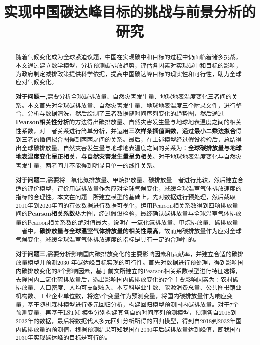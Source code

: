 \documentclass[withoutpreface,bwprint]{cumcmthesis}
\title{实现中国碳达峰目标的挑战与前景分析的研究}  %
\begin{document}
	\maketitle
\begin{abstract}
随着气候变化成为全球紧迫议题，中国在实现碳中和目标的过程中仍面临着诸多挑战，本文通过建立数学模型，分析预测碳排放趋势，评估各因素对实现碳中和目标的影响，为政府制定减排政策提供科学依据，提高中国碳达峰目标的现实性和可行性，助力全球应对气候变化。


\textbf{对于问题一,}需要分析全球碳排放量、自然灾害发生量、地球地表温度变化三者间的关系。本文首先对全球碳排放量、自然灾害发生量、地球地表温度三个附录文件，进行整合、分析与数据清洗，然后绘制了三者数据随时间序列变化的趋势图，然后通过\textbf{Pearson相关性分析}的方法得出碳排放量、自然灾害发生量与地球地表温度之间的相关性系数，对三者关系进行简单分析，并运用\textbf{三次样条插值函数}，通过\textbf{最小二乘法拟合}得到三者的插值拟合图得到两两之间的关系。最后，在上述模型经过假设检验后，总结得出全球碳排放量、自然灾害发生量与地球地表温度之间的关系为：\textbf{全球碳排放量与地球地表温度变化呈正相关}，\textbf{与自然灾害发生量呈负相关}。对于地球地表温度变化与自然灾害发生量，两者间并不能得到明显且单一的线性关系。

\textbf{对于问题二,}需要将一氧化氮排放量、甲烷排放量、碳排放量三者进行比较，然后建立合适的评价模型，评价用碳排放量作为应对全球气候变化，减缓全球温室气体排放速度的指标的合理性。本文在问题一所建立模型的基础上，先对数据进行预处理，然后截取2010年到2020年间的有效数据进行数据可视化，运用Pearson相关系数得到四项排放量间的\textbf{Pearson相关系数}热力图，经过假设检验，最终确认碳排放量与全球温室气体排放量的Pearson相关系数的绝对值最大，说明在一氧化氮排放量、甲烷排放量、碳排放量三者中，\textbf{碳排放量与全球温室气体排放量的相关性最高}，故而用碳排放量作为应对全球气候变化，减缓全球温室气体排放速度的指标是具有一定的合理性的。

\textbf{对于问题三,}需要分析影响国内碳排放变化的主要影响因素和贡献率，并建立合适的碳排放量模型并预测2030 年碳达峰目标实现的可行性。首先对数据进行预处理，得到影响国内碳排放变化的8个影响因素，基于前文所建立的Pearson相关系数模型进行特征选择，去除国内二氧化硫排放量后，选出影响国内碳排放变化的7个主要影响因素为：农村碳排放量、人口密度、人均可支配收入、本专科毕业生数、能源消费总量、公共图书馆业机构数、工业企业单位数，将这7个变量作为预测变量，将国内碳排放量作为响应变量，基于随机森林模型进行多元回归分析，构建回归模型预测国内碳排放量。对于7个预测变量，再基于LSTM 模型分别构建其各自的时间序列预测模型，预测各自2018到2032年的数据，最后将数据代入多元回归分析所得的回归模型，得到自2018到2032年国内碳排放量的预测值，根据预测结果可知我国在2030年后碳排放量达到峰值，即我国在2030年实现碳达峰的目标是可行的。


\end{abstract}
\end{document}
